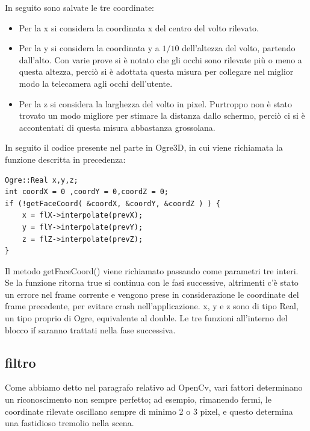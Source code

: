In seguito sono salvate le tre coordinate:
\begin{itemize}

\item Per la x si considera la coordinata x del centro del volto rilevato.
\item Per la y si considera la coordinata y a $1/10$ dell'altezza del volto, partendo dall'alto. Con varie prove si è notato che gli occhi sono rilevate più o meno a questa altezza, perciò si è adottata questa misura per collegare nel miglior modo la telecamera agli occhi dell'utente.
\item Per la z si considera la larghezza del volto in pixel. Purtroppo non è stato trovato un modo migliore per stimare la distanza dallo schermo, perciò ci si è accontentati di questa misura abbastanza grossolana.  
\end{itemize}


In seguito il codice presente nel parte in Ogre3D, in cui viene richiamata la funzione descritta in precedenza:
\begin{lstlisting}
Ogre::Real x,y,z;
int coordX = 0 ,coordY = 0,coordZ = 0;
if (!getFaceCoord( &coordX, &coordY, &coordZ ) ) {
    x = flX->interpolate(prevX);
    y = flY->interpolate(prevY);
    z = flZ->interpolate(prevZ);
}
\end{lstlisting}
Il metodo getFaceCoord() viene richiamato passando come parametri tre interi. Se la funzione ritorna true si continua con le fasi successive, altrimenti c'è stato un errore nel frame corrente e vengono prese in considerazione le coordinate del frame precedente, per evitare crash nell'applicazione. x, y e z sono di tipo Real, un tipo proprio di Ogre, equivalente al double. Le tre funzioni all'interno del blocco if saranno trattati nella fase successiva.

\subsection{filtro}
Come abbiamo detto nel paragrafo relativo ad OpenCv, vari fattori determinano un riconoscimento non sempre perfetto; ad esempio, rimanendo fermi, le coordinate rilevate oscillano sempre di minimo 2 o 3 pixel, e questo determina una fastidioso tremolio nella scena.

